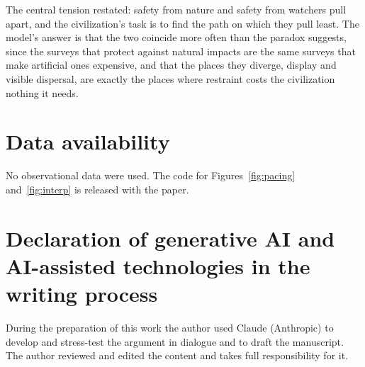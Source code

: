 \documentclass[preprint,12pt]{elsarticle}
\theoremstyle{definition}
\begin{document}
The central tension restated: safety from nature and safety from watchers pull apart, and the civilization's task is to find the path on which they pull least. The model's answer is that the two coincide more often than the paradox suggests, since the surveys that protect against natural impacts are the same surveys that make artificial ones expensive, and that the places they diverge, display and visible dispersal, are exactly the places where restraint costs the civilization nothing it needs.

\section*{Data availability}
No observational data were used. The code for Figures~\ref{fig:pacing} and~\ref{fig:interp} is released with the paper.

\section*{Declaration of generative AI and AI-assisted technologies in the writing process}
During the preparation of this work the author used Claude (Anthropic) to develop and stress-test the argument in dialogue and to draft the manuscript. The author reviewed and edited the content and takes full responsibility for it.
\end{document}
